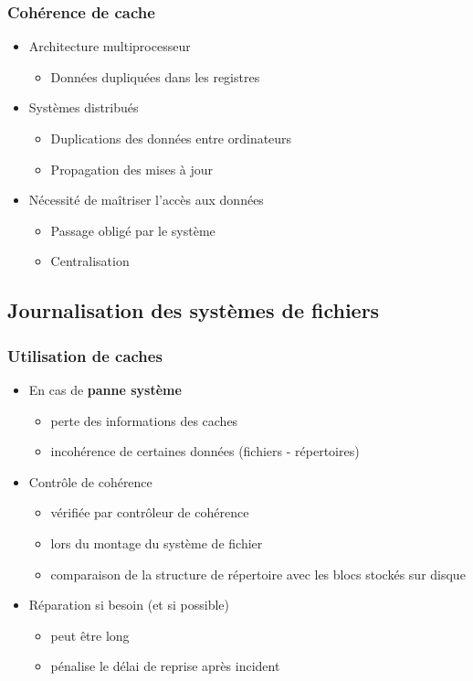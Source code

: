 \begin{frame}
\frametitle{Cohérence de cache}
\begin{itemize}
\item Architecture multiprocesseur
\begin{itemize}
\item Données dupliquées dans les registres
\end{itemize}
\item Systèmes distribués
\begin{itemize}
\item Duplications des données entre ordinateurs
\item Propagation des mises à jour
\end{itemize}
\item Nécessité de maîtriser l’accès aux données
\begin{itemize}
\item Passage obligé par le système
\item Centralisation
\end{itemize}
\end{itemize}
\end{frame}



\subsection{Journalisation des systèmes de fichiers}

\begin{frame}
\frametitle{Utilisation de caches}
\begin{itemize}
\item En cas de \textbf{panne système}
\begin{itemize}
\item perte des informations des caches
\item incohérence de certaines données (fichiers - répertoires)
\end{itemize}
\item Contrôle de cohérence
\begin{itemize}
\item vérifiée par contrôleur de cohérence
\item lors du montage du système de fichier
\item comparaison de la structure de répertoire avec les blocs stockés sur disque
\end{itemize}
\item Réparation si besoin (et si possible)
\begin{itemize}
\item peut être long
\item pénalise le délai de reprise après incident
\end{itemize}
\end{itemize}
\end{frame}

